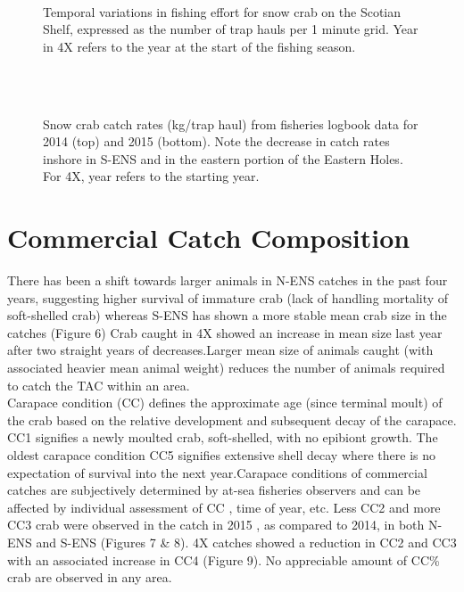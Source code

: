 \documentclass[paper=a4, fontsize=11pt]{article}
\newcommand{\D}{.}
\newcommand{\e}{\string~/ecomod_data/}   %
\newcommand{\es}{snowcrab/}
\newcommand{\Ay}{assessments/2015/}
\begin{document}
\begin{figure}[h]
    \centering\
    \caption{Temporal variations in fishing effort for snow crab on the Scotian Shelf, expressed as the number of trap hauls per 1 minute grid. Year in 4X refers to the year at the start of the fishing season.}
\end{figure}
\begin{figure}[h]
  \centering
	\\
	\subfloat{\texttt{[image: \\e \\es maps/images/logbook/cpue2015.pdf]}}\\
	\caption{Snow crab catch rates (kg/trap haul) from fisheries logbook data for 2014 (top) and 2015 (bottom). Note the decrease in catch rates inshore in S-ENS and in the eastern portion of the Eastern Holes. For 4X, year refers to the starting year.}
\end{figure}
\clearpage

\section{Commercial Catch Composition}
There has been a shift towards larger animals in N-ENS catches in the past four years, suggesting higher survival of immature crab (lack of handling mortality of soft-shelled crab) whereas S-ENS has shown a more stable mean crab size in the catches (Figure 6) Crab caught in 4X showed an increase in mean size last year after two straight years of decreases.Larger mean size of animals caught (with associated heavier mean animal weight) reduces the number of animals required to catch the TAC within an area.\\

Carapace condition (CC) defines the approximate age (since terminal moult) of the crab based on the relative development and subsequent decay of the carapace. CC1 signifies a newly moulted crab, soft-shelled, with no epibiont growth. The oldest carapace condition CC5 signifies extensive shell decay where there is no expectation of survival into the next year.Carapace conditions of commercial catches are subjectively determined by at-sea fisheries observers and can be affected by individual assessment of CC , time of year, etc.  Less CC2 and more CC3 crab were observed in the catch in 2015 , as compared to 2014, in both N-ENS and S-ENS (Figures 7 \& 8). 4X catches showed a reduction in CC2 and CC3 with an associated increase in CC4 (Figure 9). No appreciable amount of CC\% crab are observed in any area.\\
\end{document}
